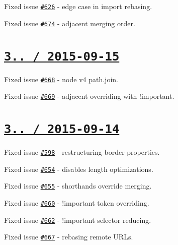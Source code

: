 \begin{DoxyItemize}
\item Fixed issue \href{https://github.com/jakubpawlowicz/clean-css/issues/626}{\tt \#626} -\/ edge case in import rebasing.
\item Fixed issue \href{https://github.com/jakubpawlowicz/clean-css/issues/674}{\tt \#674} -\/ adjacent merging order.
\end{DoxyItemize}

\section*{\href{https://github.com/jakubpawlowicz/clean-css/compare/v3.4.2...v3.4.3}{\tt 3.. / 2015-\/09-\/15} }


\begin{DoxyItemize}
\item Fixed issue \href{https://github.com/jakubpawlowicz/clean-css/issues/668}{\tt \#668} -\/ node v4 path.\+join.
\item Fixed issue \href{https://github.com/jakubpawlowicz/clean-css/issues/669}{\tt \#669} -\/ adjacent overriding with {\ttfamily !important}.
\end{DoxyItemize}

\section*{\href{https://github.com/jakubpawlowicz/clean-css/compare/v3.4.1...v3.4.2}{\tt 3.. / 2015-\/09-\/14} }


\begin{DoxyItemize}
\item Fixed issue \href{https://github.com/jakubpawlowicz/clean-css/issues/598}{\tt \#598} -\/ restructuring border properties.
\item Fixed issue \href{https://github.com/jakubpawlowicz/clean-css/issues/654}{\tt \#654} -\/ disables length optimizations.
\item Fixed issue \href{https://github.com/jakubpawlowicz/clean-css/issues/655}{\tt \#655} -\/ shorthands override merging.
\item Fixed issue \href{https://github.com/jakubpawlowicz/clean-css/issues/660}{\tt \#660} -\/ !important token overriding.
\item Fixed issue \href{https://github.com/jakubpawlowicz/clean-css/issues/662}{\tt \#662} -\/ !important selector reducing.
\item Fixed issue \href{https://github.com/jakubpawlowicz/clean-css/issues/667}{\tt \#667} -\/ rebasing remote U\+R\+Ls.
\end{DoxyItemize}

